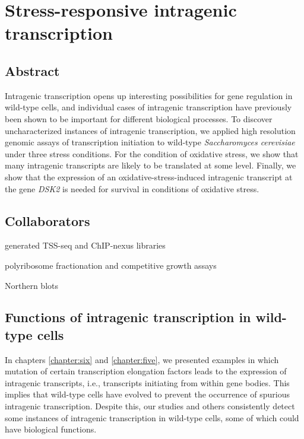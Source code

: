 \chapter{Stress-responsive intragenic transcription}
\label{chapter:stress}

\section{Abstract}

Intragenic transcription opens up interesting possibilities for gene regulation in wild-type cells, and individual cases of intragenic transcription have previously been shown to be important for different biological processes.
To discover uncharacterized instances of intragenic transcription, we applied high resolution genomic assays of transcription initiation to wild-type \textit{Saccharomyces cerevisiae} under three stress conditions.
For the condition of oxidative stress, we show that many intragenic transcripts are likely to be translated at some level.
Finally, we show that the expression of an oxidative-stress-induced intragenic transcript at the gene \textit{DSK2} is needed for survival in conditions of oxidative stress.

\section{Collaborators}

\begin{description}[align=right, labelwidth=5cm, noitemsep, leftmargin=!]
    \item [Steve Doris] generated TSS-seq and ChIP-nexus libraries
    \item [Dan Spatt] polyribosome fractionation and competitive growth assays
    \item [James Warner] Northern blots
\end{description}

\section{Functions of intragenic transcription in wild-type cells}

In chapters \ref{chapter:six} and \ref{chapter:five}, we presented examples in which mutation of certain transcription elongation factors leads to the expression of intragenic transcripts, i.e., transcripts initiating from within gene bodies.
This implies that wild-type cells have evolved to prevent the occurrence of spurious intragenic transcription.
Despite this, our studies and others \citep{malabat2015, pelechano2013a} consistently detect some instances of intragenic transcription in wild-type cells, some of which could have biological functions.

